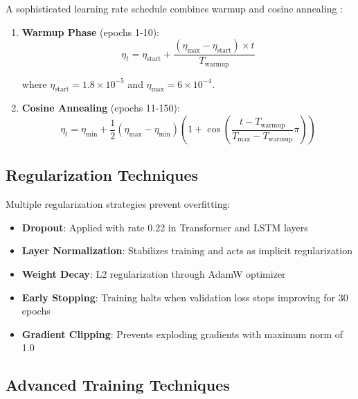 A sophisticated learning rate schedule combines warmup and cosine annealing \citep{loshchilov2016sgdr, smith2018superconvergence}:

\begin{enumerate}
    \item \textbf{Warmup Phase} (epochs 1-10):
    \begin{equation}
\eta_t = \eta_{\text{start}} + \frac{(\eta_{\text{max}} - \eta_{\text{start}}) \times t}{T_{\text{warmup}}}
\end{equation}

    where $\eta_{\text{start}} = 1.8 \times 10^{-5}$ and $\eta_{\text{max}} = 6 \times 10^{-4}$.
    
    \item \textbf{Cosine Annealing} (epochs 11-150):
    \begin{equation}
\eta_t = \eta_{\text{min}} + \frac{1}{2}(\eta_{\text{max}} - \eta_{\text{min}})\left(1 + \cos\left(\frac{t - T_{\text{warmup}}}{T_{\text{max}} - T_{\text{warmup}}}\pi\right)\right)
\end{equation}
\end{enumerate}

\subsection{Regularization Techniques}
\label{subsec:regularization}

Multiple regularization strategies prevent overfitting:

\begin{itemize}
    \item \textbf{Dropout}: Applied with rate 0.22 in Transformer and LSTM layers \citep{srivastava2014dropout}
    \item \textbf{Layer Normalization}: Stabilizes training and acts as implicit regularization \citep{ba2016layer}
    \item \textbf{Weight Decay}: L2 regularization through AdamW optimizer
    \item \textbf{Early Stopping}: Training halts when validation loss stops improving for 30 epochs
    \item \textbf{Gradient Clipping}: Prevents exploding gradients with maximum norm of 1.0
\end{itemize}

\subsection{Advanced Training Techniques}
\label{subsec:advanced_training}

